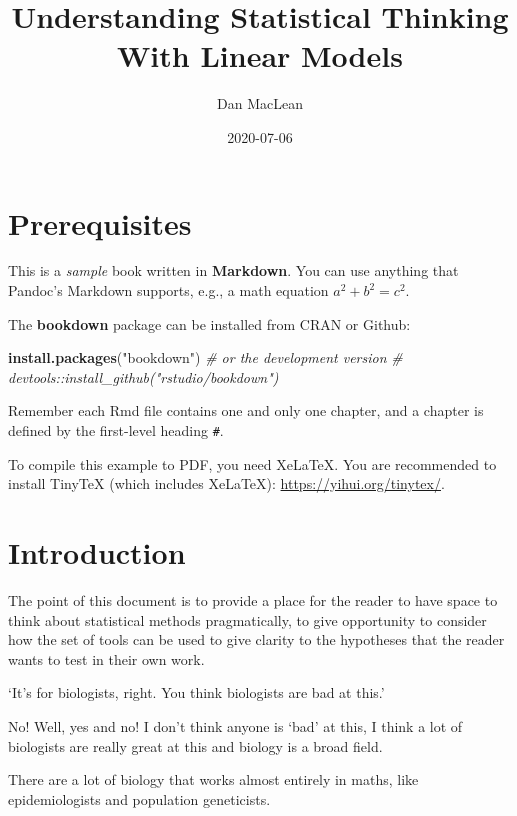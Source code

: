 \documentclass[]{book}
\title{Understanding Statistical Thinking With Linear Models}
\author{Dan MacLean}
\date{2020-07-06}
\newenvironment{Shaded}{\begin{snugshade}}{\end{snugshade}}
\newcommand{\CommentTok}[1]{\textcolor[rgb]{0.56,0.35,0.01}{\textit{#1}}}
\newcommand{\KeywordTok}[1]{\textcolor[rgb]{0.13,0.29,0.53}{\textbf{#1}}}
\newcommand{\NormalTok}[1]{#1}
\newcommand{\StringTok}[1]{\textcolor[rgb]{0.31,0.60,0.02}{#1}}
\begin{document}
\maketitle

{
\setcounter{tocdepth}{1}
\tableofcontents
}
\hypertarget{prerequisites}{%
\chapter{Prerequisites}\label{prerequisites}}

This is a \emph{sample} book written in \textbf{Markdown}. You can use anything that Pandoc's Markdown supports, e.g., a math equation \(a^2 + b^2 = c^2\).

The \textbf{bookdown} package can be installed from CRAN or Github:

\begin{Shaded}
\begin{Highlighting}[]
\KeywordTok{install.packages}\NormalTok{(}\StringTok{"bookdown"}\NormalTok{)}
\CommentTok{# or the development version}
\CommentTok{# devtools::install_github("rstudio/bookdown")}
\end{Highlighting}
\end{Shaded}

Remember each Rmd file contains one and only one chapter, and a chapter is defined by the first-level heading \texttt{\#}.

To compile this example to PDF, you need XeLaTeX. You are recommended to install TinyTeX (which includes XeLaTeX): \url{https://yihui.org/tinytex/}.

\hypertarget{intro}{%
\chapter{Introduction}\label{intro}}

The point of this document is to provide a place for the reader to have space to think about statistical methods pragmatically, to give opportunity to consider how the set of tools can be used to give clarity to the hypotheses that the reader wants to test in their own work.

`It's for biologists, right. You think biologists are bad at this.'

No! Well, yes and no! I don't think anyone is `bad' at this, I think a lot of biologists are really great at this and biology is a broad field.

There are a lot of biology that works almost entirely in maths, like epidemiologists and population geneticists.
\end{document}
